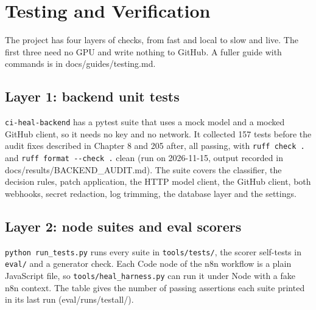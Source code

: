 \section{Testing and Verification}

The project has four layers of checks, from fast and local to slow and live. The first three need no GPU and write nothing to GitHub. A fuller guide with commands is in docs/\allowbreak{}guides/\allowbreak{}testing.md.

\subsection{Layer 1: backend unit tests}

\texttt{ci-\allowbreak{}heal-\allowbreak{}backend} has a pytest suite that uses a mock model and a mocked GitHub client, so it needs no key and no network. It collected 157 tests before the audit fixes described in Chapter 8 and 205 after, all passing, with \texttt{ruff check .\allowbreak{}} and \texttt{ruff format -\allowbreak{}-\allowbreak{}check .\allowbreak{}} clean (run on 2026-11-15, output recorded in docs/\allowbreak{}results/\allowbreak{}BACKEND\_\allowbreak{}AUDIT.md). The suite covers the classifier, the decision rules, patch application, the HTTP model client, the GitHub client, both webhooks, secret redaction, log trimming, the database layer and the settings.

\subsection{Layer 2: node suites and eval scorers}

\texttt{python run\_\allowbreak{}tests.\allowbreak{}py} runs every suite in \texttt{tools/\allowbreak{}tests/\allowbreak{}}, the scorer self-tests in \texttt{eval/\allowbreak{}} and a generator check. Each Code node of the n8n workflow is a plain JavaScript file, so \texttt{tools/\allowbreak{}heal\_\allowbreak{}harness.\allowbreak{}py} can run it under Node with a fake n8n context. The table gives the number of passing assertions each suite printed in its last run (eval/\allowbreak{}runs/\allowbreak{}testall/\allowbreak{}).

